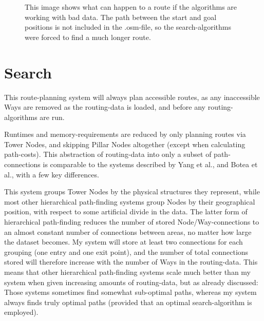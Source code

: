 \begin{figure}
	\centering
	\caption[Sup-optimal path due to bad data]{This image shows what can happen to a route if the algorithms are working with bad data. The path between the start and goal positions is not included in the .osm-file, so the search-algorithms were forced to find a much longer route.}
	\label{fig:badDataBadPath}
\end{figure}

\newpage
\section{Search}
This route-planning system will always plan accessible routes, as any inaccessible Ways are removed as the routing-data is loaded, and before any routing-algorithms are run.

Runtimes and memory-requirements are reduced by only planning routes via Tower Nodes, and skipping Pillar Nodes altogether (except when calculating path-costs). This abstraction of routing-data into only a subset of path-connections is comparable to the systems described by Yang et al.\cite{CCAI07}, and Botea et al.\cite{botea-etal-jogd04}, with a few key differences.

This system groups Tower Nodes by the physical structures they represent, while most other hierarchical path-finding systems group Nodes by their geographical position, with respect to some artificial divide in the data. The latter form of hierarchical path-finding reduces the number of stored Node/Way-connections to an almost constant number of connections between areas, no matter how large the dataset becomes. My system will store at least two connections for each grouping (one entry and one exit point), and the number of total connections stored will therefore increase with the number of Ways in the routing-data. This means that other hierarchical path-finding systems scale much better than my system when given increasing amounts of routing-data, but as already discussed: Those systems sometimes find somewhat sub-optimal paths, whereas my system always finds truly optimal paths (provided that an optimal search-algorithm is employed).

